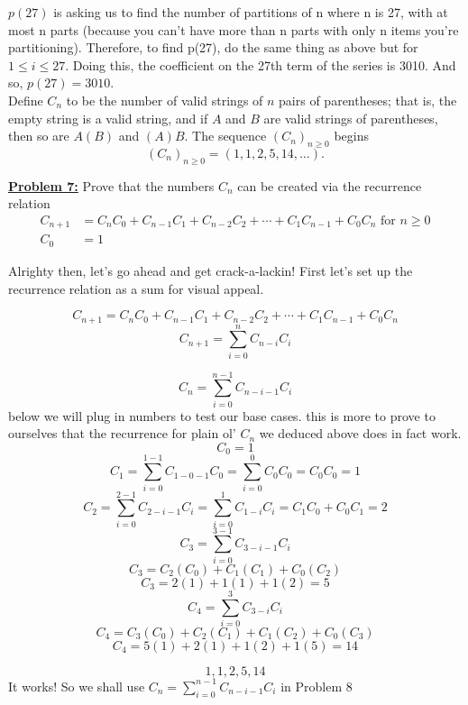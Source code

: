 \documentclass[10pt, AMS Euler]{article}
\begin{document}
    $p(27)$ is asking us to find the number of partitions of n where n is 27, with at most n parts (because you can't have more than n parts with only n items you're partitioning). Therefore, to find p(27), do the same thing as above but for $1 \leq i \leq 27$. Doing this, the coefficient on the 27th term of the series is 3010. And so, $p(27) = 3010$.\\

 
	  Define $C_n$ to be the number of valid strings of $n$ pairs of parentheses; that is, the empty string is a valid string, and if $A$ and $B$ are valid strings of parentheses, then so are $A(B)$ and $(A)B$. The sequence $\left(C_n\right)_{n \geq 0}$ begins 
	$$\left(C_n\right)_{n \geq 0} = (1,1,2,5,14, \dots ).$$

	\noindent\underline{\bf Problem 7:}  Prove that the numbers $C_n$ can be created via the recurrence relation 
	\begin{align*} C_{n+1} & = C_nC_0 + C_{n-1}C_1 + C_{n-2}C_2 + \cdots + C_1C_{n-1} + C_0C_n \mbox{ for } n \geq 0\\
		C_0 & = 1 
	\end{align*}

 Alrighty then, let's go ahead and get crack-a-lackin! First let's set up the recurrence relation as a sum for visual appeal. 

    $$ C_{n+1} = C_nC_0 + C_{n-1}C_1 + C_{n-2}C_2 + \cdots + C_1C_{n-1} + C_0C_n $$
    $$ C_{n+1} = \sum_{i=0}^n C_{n-i} C_i $$

    $$ C_n = \sum_{i=0}^{n-1} C_{n-i-1} C_i $$
below we will plug in numbers to test our base cases. this is more to prove to ourselves that the recurrence for plain ol' $C_n$ we deduced above does in fact work. 
    $$ C_0 = 1 $$
    $$ C_1 = \sum_{i=0}^{1-1} C_{1-0-1} C_0 = \sum_{i=0}^{0} C_{0} C_0 = C_0 C_0 = 1 $$
    $$ C_2 = \sum_{i=0}^{2-1} C_{2-i-1} C_i = \sum_{i=0}^{1} C_{1-i} C_i = C_1 C_0 + C_0 C_1 = 2 $$
    $$ C_3 = \sum_{i=0}^{3-1} C_{3-i-1} C_i $$
    $$ C_3 = C_2(C_0) + C_1(C_1) + C_0(C_2) $$
    $$ C_3 = 2(1) + 1(1) + 1(2) = 5 $$
    $$ C_4 = \sum_{i=0}^{3} C_{3-i} C_i $$
    $$ C_4 = C_3(C_0) + C_2(C_1) + C_1(C_2) + C_0(C_3) $$
    $$ C_4 = 5(1) + 2(1) + 1(2) + 1(5) = 14 $$

    $$ 1, 1, 2, 5, 14 $$
    It works! So we shall use $ C_n = \sum_{i=0}^{n-1} C_{n-i-1} C_i $ in Problem 8 \\
    \\
	
\end{document}
